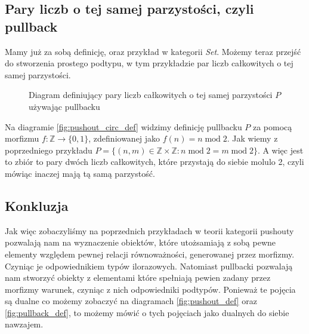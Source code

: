 \subsection{Pary liczb o tej samej parzystości, czyli pullback}
Mamy już za sobą definicję, oraz przykład w kategorii \emph{Set}. Możemy teraz przejść do stworzenia prostego podtypu, w tym przykładzie par liczb całkowitych o tej samej parzystości.  
\begin{figure}[!htp]
    \centering
    \caption{Diagram definiujący pary liczb całkowitych o tej samej parzystości $P$ używając pullbacku}
    \label{fig:pullback_pair_def}
\end{figure}
Na diagramie \ref{fig:pushout_circ_def} widzimy definicję pullbacku $P$ za pomocą morfizmu $f: \mathbb{Z} \rightarrow \{0, 1\}$, zdefiniowanej jako $f(n) = n \;\textrm{mod}\; 2$. Jak wiemy z poprzedniego przykładu $P = \{(n, m) \in \mathbb{Z} \times \mathbb{Z} : n \;\textrm{mod}\; 2 = m \;\textrm{mod}\; 2 \}$. A więc jest to zbiór to pary dwóch liczb całkowitych, które przystają do siebie molulo 2, czyli mówiąc inaczej mają tą samą parzystość.
\subsection{Konkluzja}
Jak więc zobaczyliśmy na poprzednich przykładach w teorii kategorii pushouty pozwalają nam na wyznaczenie obiektów, które utożsamiają z sobą pewne elementy względem pewnej relacji równoważności, generowanej przez morfizmy. Czyniąc je odpowiednikiem typów ilorazowych. Natomiast pullbacki pozwalają nam stworzyć obiekty z elementami które spełniają pewien zadany przez morfizmy warunek, czyniąc z nich odpowiedniki podtypów. Ponieważ te pojęcia są dualne co możemy zobaczyć na diagramach \ref{fig:pushout_def} oraz \ref{fig:pullback_def}, to możemy mówić o tych pojęciach jako dualnych do siebie nawzajem. 

